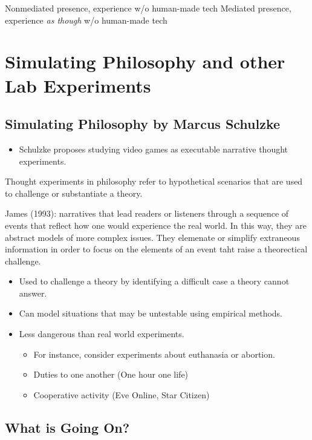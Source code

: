 \documentclass[
  letterpaper,
  DIV=11,
  numbers=noendperiod]{scrreprt}
\providecommand{\tightlist}{%
  \setlength{\itemsep}{0pt}\setlength{\parskip}{0pt}}\usepackage{longtable,booktabs,array}
\begin{document}
\begin{tcolorbox}[enhanced jigsaw, arc=.35mm, breakable, rightrule=.15mm, colback=white, colframe=quarto-callout-important-color-frame, bottomrule=.15mm, leftrule=.75mm, opacityback=0, toprule=.15mm, left=2mm]
\begin{tcolorbox}[enhanced jigsaw, arc=.35mm, breakable, rightrule=.15mm, colback=white, colframe=quarto-callout-tip-color-frame, bottomrule=.15mm, leftrule=.75mm, opacityback=0, toprule=.15mm, left=2mm]
Nonmediated presence, experience w/o human-made tech Mediated presence,
experience \emph{as though} w/o human-made tech

\chapter{Simulating Philosophy and other Lab
Experiments}\label{simulating-philosophy-and-other-lab-experiments}

\section{Simulating Philosophy by Marcus
Schulzke}\label{simulating-philosophy-by-marcus-schulzke}

\begin{itemize}
\tightlist
\item
  Schulzke proposes studying video games as executable narrative thought
  experiments.
\end{itemize}

Thought experiments in philosophy refer to hypothetical scenarios that
are used to challenge or substantiate a theory.

James (1993): narratives that lead readers or listeners through a
sequence of events that reflect how one would experience the real world.
In this way, they are abstract models of more complex issues. They
elemenate or simplify extraneous information in order to focus on the
elements of an event taht raise a theorectical challenge.

\begin{itemize}
\tightlist
\item
  Used to challenge a theory by identifying a difficult case a theory
  cannot answer.
\item
  Can model situations that may be untestable using empirical methods.
\item
  Less dangerous than real world experiments.

  \begin{itemize}
  \tightlist
  \item
    For instance, consider experiments about euthanasia or abortion.
  \item
    Duties to one another (One hour one life)
  \item
    Cooperative activity (Eve Online, Star Citizen)
  \end{itemize}
\end{itemize}

\section{What is Going On?}\label{what-is-going-on}


\end{tcolorbox}
\end{tcolorbox}
\end{document}
